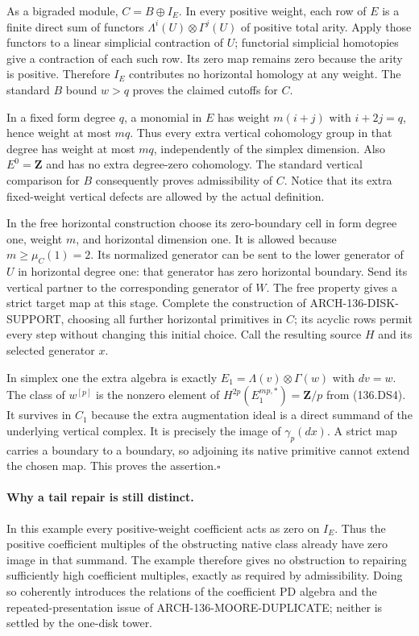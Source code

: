 As a bigraded module, $C=B\oplus I_E$.  In every positive weight,
each row of $E$ is a finite direct sum of functors
$\Lambda^i(U)\otimes\Gamma^j(U)$ of positive total arity.
Apply those functors to a linear simplicial contraction of $U$;
functorial simplicial homotopies give a contraction of each such
row.  Its zero map remains zero because the arity is positive.
Therefore $I_E$ contributes no horizontal homology at any weight.
The standard $B$ bound $w>q$ proves the claimed cutoffs for $C$.

In a fixed form degree $q$, a monomial in $E$ has weight
$m(i+j)$ with $i+2j=q$, hence weight at most $mq$.
Thus every extra vertical cohomology group in that degree has
weight at most $mq$, independently of the simplex dimension.
Also $E^0=\mathbf Z$ and has no extra degree-zero cohomology.
The standard vertical comparison for $B$ consequently proves
admissibility of $C$.  Notice that its extra fixed-weight vertical
defects are allowed by the actual definition.

In the free horizontal construction choose its zero-boundary cell
in form degree one, weight $m$, and horizontal dimension one.
It is allowed because $m\geq\mu_C(1)=2$.  Its normalized generator
can be sent to the lower generator of $U$ in horizontal degree one:
that generator has zero horizontal boundary.  Send its vertical
partner to the corresponding generator of $W$.
The free property gives a strict target map at this stage.  Complete
the construction of ARCH-136-DISK-SUPPORT, choosing all further
horizontal primitives in $C$; its acyclic rows permit every step
without changing this initial choice.  Call the resulting source
$H$ and its selected generator $x$.

In simplex one the extra algebra is exactly
$E_1=\Lambda(v)\otimes\Gamma(w)$ with $dv=w$.
The class of $w^{[p]}$ is the nonzero element of
$H^{2p}(E_1^{mp,*})=\mathbf Z/p$ from (136.DS4).
It survives in $C_1$ because the extra augmentation ideal is a
direct summand of the underlying vertical complex.  It is precisely
the image of $\gamma_p(dx)$.  A strict map carries a boundary to
a boundary, so adjoining its native primitive cannot extend the
chosen map.  This proves the assertion.\hfill$\square$

\paragraph{Why a tail repair is still distinct.}
In this example every positive-weight coefficient acts as zero on
$I_E$.  Thus the positive coefficient multiples of the obstructing
native class already have zero image in that summand.  The example
therefore gives no obstruction to repairing sufficiently high
coefficient multiples, exactly as required by admissibility.
Doing so coherently introduces the relations of the coefficient
PD algebra and the repeated-presentation issue of
ARCH-136-MOORE-DUPLICATE; neither is settled by the one-disk tower.
